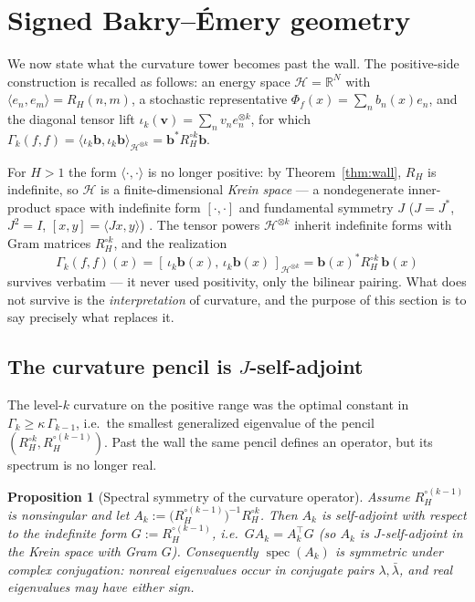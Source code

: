 \documentclass[11pt,reqno]{amsart}
\theoremstyle{plain}
\newtheorem{proposition}[theorem]{Proposition}
\theoremstyle{definition}
\newcommand{\R}{\mathbb{R}}
\newcommand{\HH}{\mathcal{H}}
\newcommand{\Had}{\mathbin{\circ}}
\newcommand{\Gam}{\Gamma}
\DeclareMathOperator{\spec}{spec}
\begin{document}
\section{Signed Bakry--\'Emery geometry}\label{sec:signed}

We now state what the curvature tower becomes past the wall. The positive-side
construction is recalled as follows: an energy space $\HH=\R^N$ with
$\langle e_n,e_m\rangle=R_H(n,m)$, a stochastic representative
$\Phi_f(x)=\sum_n b_n(x)e_n$, and the diagonal tensor lift
$\iota_k(\mathbf v)=\sum_n v_n e_n^{\otimes k}$, for which
$\Gam_k(f,f)=\langle\iota_k\mathbf b,\iota_k\mathbf b\rangle_{\HH^{\otimes k}}
=\mathbf b^{*}R_H^{\Had k}\mathbf b$.

For $H>1$ the form $\langle\cdot,\cdot\rangle$ is no longer positive: by
Theorem~\ref{thm:wall}, $R_H$ is indefinite, so $\HH$ is a finite-dimensional
\emph{Krein space} --- a nondegenerate inner-product space with indefinite form
$[\cdot,\cdot]$ and fundamental symmetry $J$ ($J=J^{*}$, $J^{2}=I$,
$[x,y]=\langle Jx,y\rangle$) \cite{Bognar}. The tensor powers $\HH^{\otimes k}$
inherit indefinite forms with Gram matrices $R_H^{\Had k}$, and the realization
\begin{equation}\label{eq:krein-real}
  \Gam_k(f,f)(x)=[\,\iota_k\mathbf b(x),\,\iota_k\mathbf b(x)\,]_{\HH^{\otimes k}}
  =\mathbf b(x)^{*}R_H^{\Had k}\,\mathbf b(x)
\end{equation}
survives verbatim --- it never used positivity, only the bilinear pairing. What
does not survive is the \emph{interpretation} of curvature, and the purpose of
this section is to say precisely what replaces it.

\subsection{The curvature pencil is $J$-self-adjoint}
The level-$k$ curvature on the positive range was the optimal constant in
$\Gam_k\ge\kappa\,\Gam_{k-1}$, i.e.\ the smallest generalized eigenvalue of the
pencil $(R_H^{\Had k},R_H^{\Had(k-1)})$. Past the wall the same pencil defines an
operator, but its spectrum is no longer real.

\begin{proposition}[Spectral symmetry of the curvature operator]\label{prop:Jself}
Assume $R_H^{\Had(k-1)}$ is nonsingular and let
$A_k:=\bigl(R_H^{\Had(k-1)}\bigr)^{-1}R_H^{\Had k}$. Then $A_k$ is self-adjoint
with respect to the indefinite form $G:=R_H^{\Had(k-1)}$, i.e.\
$G A_k=A_k^{\top}G$ (so $A_k$ is $J$-self-adjoint in the Krein space with Gram
$G$). Consequently $\spec(A_k)$ is symmetric under complex conjugation: nonreal
eigenvalues occur in conjugate pairs $\lambda,\bar\lambda$, and real eigenvalues
may have either sign.
\end{proposition}
\end{document}

